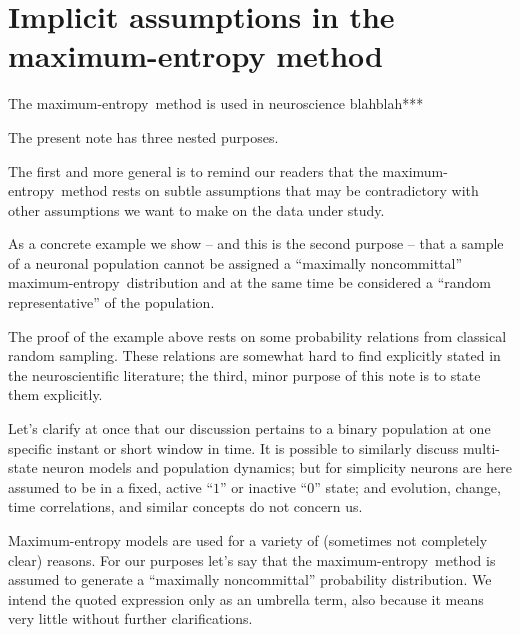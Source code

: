 \documentclass{article}
\title{\pdftitle}
\author{ V. Rostami\\
  Forschungszentrum Jülich INM-6\\Hitlerland\\
  \texttt{v.rostami@fz-juelich.de}
  \And
  P.G.L. Porta Mana\\Mussoliniland
  \And E. Torre\\Moneylaunderingland  
}
\theoremstyle{remark}
\theoremstyle{innote}
\newcommand*{\citep}{\parencites}
\renewcommand*{\cite}{\citep}
\renewcommand*{\|}{\mathpunct{|}}%
\theoremstyle{simple}
\newcommand*{\me}{maximum-entropy}
\begin{document}

\maketitle

\begin{abstract}
  ***%
\end{abstract}

\section{Implicit assumptions in the maximum-entropy method}

The \me\ method is used in neuroscience blahblah***

The present note has three nested purposes.

The first and more general is to remind our readers that the \me\ method
rests on subtle assumptions that may be contradictory with other
assumptions we want to make on the data under study.

As a concrete example we show -- and this is the second purpose -- that a
sample of a neuronal population cannot be assigned a \enquote{maximally
  noncommittal} \me\ distribution and at the same time be considered a
\enquote{random representative} of the population.

The proof of the example above rests on some probability relations from
classical random sampling. These relations are somewhat hard to find
explicitly stated in the neuroscientific literature; the third, minor
purpose of this note is to state them explicitly.


Let's clarify at once that our discussion pertains to a binary population at
one specific instant or short window in time. It is possible to
similarly discuss multi-state neuron models and population dynamics; but for
simplicity neurons are here assumed to be in a fixed, active \enquote{$1$}
or inactive \enquote{$0$} state; and evolution, change, time correlations,
and similar concepts do not concern us.


Maximum-entropy models are used for a variety of (sometimes not completely
clear) reasons. For our purposes let's say that the \me\ method is assumed
to generate a \enquote{maximally noncommittal} \cite{jaynes1963} probability
distribution. We intend the quoted expression only as an umbrella term,
also because it means very little without further clarifications.
\end{document}
